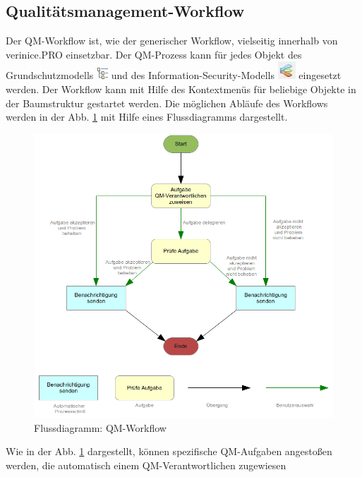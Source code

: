 \documentclass[a4paper,10pt]{book}
\begin{document}
\subsection{Qualitätsmanagement-Workflow}
Der QM-Workflow ist, wie der generischer Workflow, vielseitig innerhalb von verinice.\textsc{PRO} einsetzbar. Der QM-Prozess kann für jedes Objekt des
Grundschutzmodells \includegraphics[height=2ex]{Icon/GS_Modell.png} und des Information-Security-Modells \includegraphics[height=2ex]{Icon/Informationssicherheitsmodell.png}
eingesetzt werden. Der Workflow kann mit Hilfe des Kontextmenüs für beliebige Objekte in der Baumstruktur gestartet werden.
Die möglichen Abläufe des Workflows werden in der Abb. \ref{Flussdiagramm: QM-Workflow} mit Hilfe eines Flussdiagramms dargestellt.
\begin{figure}[htb!]
  \centering
  \includegraphics[scale=.40]{Screenshot/Qm-workflow.png}
  \caption{\label{Flussdiagramm: QM-Workflow} Flussdiagramm: QM-Workflow}
\end{figure}
Wie in der Abb. \ref{Flussdiagramm: QM-Workflow} dargestellt, können spezifische QM-Aufgaben angestoßen werden, die automatisch einem QM-Verantwortlichen zugewiesen
\end{document}
